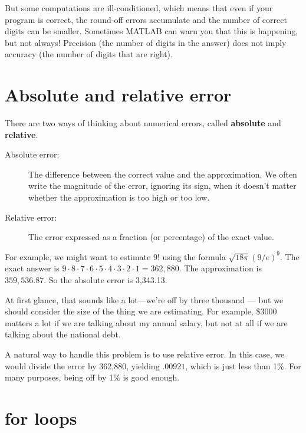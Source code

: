 \documentclass[
]{book}
\numberwithin{Answer}{chapter}
\numberwithin{Exercise}{chapter}
\begin{document}
But some computations are ill-conditioned, which means that even if your program is correct, the round-off errors accumulate and the number of correct
digits can be smaller.  Sometimes MATLAB can warn you that
this is happening, but not always!  Precision (the number of digits
in the answer) does not imply accuracy (the number of digits that
are right).


\section{Absolute and relative error}

There are two ways of thinking about numerical errors, called {\bf
absolute} and {\bf relative}.

\begin{description}

\item[Absolute error:] The difference between the correct value and
the approximation.  We often write the magnitude of the error,
ignoring its sign, when it doesn't matter whether the approximation
is too high or too low.

\item[Relative error:] The error expressed as a fraction (or percentage)
of the exact value.
\end{description}

For example, we might want to estimate $9!$ using the formula $\sqrt
{18 \pi} ( 9 / e)^9$.  The exact answer is $9 \cdot 8 \cdot 7 \cdot 6
\cdot 5 \cdot 4 \cdot 3 \cdot 2 \cdot 1 = 362,880$.  The approximation
is $359,536.87$.  So the absolute error is 3,343.13.

At first glance, that sounds like a lot---we're off by three
thousand --- but we should consider the size of the
thing we are estimating.  For example, \$3000 matters a lot
if we are talking about my annual salary, but not at all if we
are talking about the national debt.

A natural way to handle this problem is to use relative
error.
In this case, we would divide the error
by 362,880, yielding $.00921$, which is just less than 1\%.
For many purposes, being off by 1\% is good enough.


\section{for loops}

\end{document}
